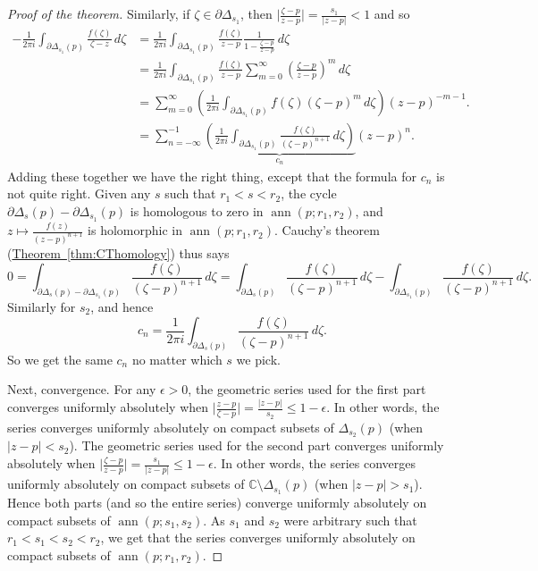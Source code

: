 \documentclass[12pt,openany]{book}
\newcommand{\ann}{\operatorname{ann}}
\newcommand{\sabs}[1]{\lvert {#1} \rvert}
\newcommand{\babs}[1]{\bigl\lvert {#1} \bigr\rvert}
\newcommand{\C}{{\mathbb{C}}}
\theoremstyle{plain}
\theoremstyle{remark}
\theoremstyle{definition}
\theoremstyle{exercise}
\theoremstyle{example}
\newcommand{\thmref}[1]{\hyperref[#1]{Theorem~\ref*{#1}}}
\begin{document}
\begin{proof}[Proof of the theorem]
Similarly, 
if $\zeta \in \partial \Delta_{s_1}$, then
$\babs{\frac{\zeta-p}{z-p}} = \frac{s_1}{\sabs{z-p}} < 1$ and so
\begin{equation*}
\begin{split}
-\frac{1}{2\pi i}
\int_{\partial \Delta_{s_1}(p)} \frac{f(\zeta)}{\zeta-z} \, d\zeta 
& = 
\frac{1}{2\pi i}
\int_{\partial \Delta_{s_1}(p)} \frac{f(\zeta)}{z-p}
\frac{1}{1-\frac{\zeta-p}{z-p}} \, d\zeta
\\
& =
\frac{1}{2\pi i}
\int_{\partial \Delta_{s_1}(p)} \frac{f(\zeta)}{z-p}
\sum_{m=0}^\infty
{\left(\frac{\zeta-p}{z-p}\right)}^m \, d\zeta
\\
& =
\sum_{m=0}^\infty
\left(
\frac{1}{2\pi i}
\int_{\partial \Delta_{s_1}(p)} f(\zeta){(\zeta-p)}^{m}
 \, d\zeta
\right)
{(z-p)}^{-m-1} .
\\
& =
\sum_{n=-\infty}^{-1}
\underbrace{
\left(
\frac{1}{2\pi i}
\int_{\partial \Delta_{s_1}(p)} \frac{f(\zeta)}{{(\zeta-p)}^{n+1}}
 \, d\zeta
\right)
}_{c_n}
{(z-p)}^{n} .
\end{split}
\end{equation*}
Adding these together we have the right thing, except that the formula for $c_n$
is not quite right.  Given any $s$ such that
$r_1 < s < r_2$,
the cycle
$\partial \Delta_{s}(p) - \partial \Delta_{s_1}(p)$ is homologous to zero in
$\ann(p;r_1,r_2)$, and 
$z \mapsto \frac{f(z)}{{(z-p)}^{n+1}}$ is holomorphic in 
$\ann(p;r_1,r_2)$.  Cauchy's theorem (\thmref{thm:CThomology}) thus says
\begin{equation*}
0 = \int_{\partial \Delta_{s}(p) - \partial \Delta_{s_1}(p)}
\frac{f(\zeta)}{{(\zeta-p)}^{n+1}} \, d\zeta
=
\int_{\partial \Delta_{s}(p)}
\frac{f(\zeta)}{{(\zeta-p)}^{n+1}} \, d\zeta
-
\int_{\partial \Delta_{s_1}(p)}
\frac{f(\zeta)}{{(\zeta-p)}^{n+1}} \, d\zeta .
\end{equation*}
Similarly for $s_2$, and hence
\begin{equation*}
c_n = \frac{1}{2\pi i}
\int_{\partial \Delta_{s}(p)} \frac{f(\zeta)}{{(\zeta-p)}^{n+1}}
 \, d\zeta .
\end{equation*}
So we get the same $c_n$ no matter which $s$ we pick.

Next, convergence.
For any $\epsilon > 0$,
the geometric series used for the first part converges uniformly
absolutely when $\babs{\frac{z-p}{\zeta-p}} = \frac{\sabs{z-p}}{s_2} \leq
1-\epsilon$.  In other words, the series converges uniformly absolutely
on compact subsets of $\Delta_{s_2}(p)$ (when $\sabs{z-p} < s_2$).
%
The geometric series used for the second part converges uniformly
absolutely when $\babs{\frac{\zeta-p}{z-p}} = \frac{s_1}{\sabs{z-p}} \leq
1-\epsilon$.  In other words, the series converges uniformly absolutely
on compact subsets of $\C \setminus \Delta_{s_1}(p)$ (when $\sabs{z-p} > s_1$).
%
Hence both parts (and so the entire series) 
converge uniformly absolutely on compact
subsets of $\ann(p;s_1,s_2)$.  As $s_1$ and $s_2$ were arbitrary such that
$r_1 < s_1 < s_2 < r_2$, we get that the series
converges uniformly absolutely on compact subsets of $\ann(p;r_1,r_2)$.


\end{proof}
\end{document}

